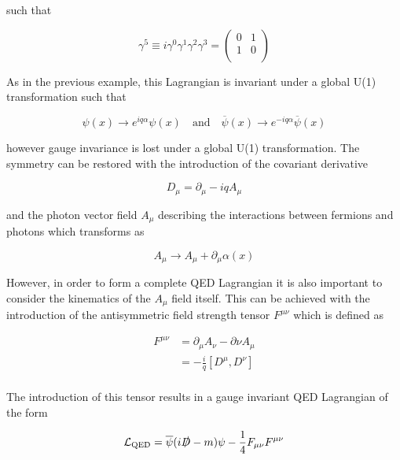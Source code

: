 \documentclass[12pt,a4paper,epsf,portrait,times,epsfig]{report}
\begin{document}
	such that

	\begin{equation}
		\gamma^{5} \equiv i\gamma^{0}\gamma^{1}\gamma^{2}\gamma^{3}=\begin{pmatrix}
			0 & 1 \\
			1 & 0 \\
		\end{pmatrix} 
	\end{equation}

	As in the previous example, this Lagrangian is invariant under a global U(1) transformation such that

	\begin{equation}
		\psi(x) \rightarrow e^{iq\alpha}\psi(x)  
		\quad\mathrm{and}\quad
		\overline{\psi}(x) \rightarrow e^{-iq\alpha}\overline{\psi}(x)
	\end{equation}

	however gauge invariance is lost under a global U(1) transformation. The symmetry can be restored with the introduction of the covariant derivative 
	
	\begin{equation}
		D_{\mu} = \partial_{\mu} - iqA_{\mu}
	\end{equation}

	and the photon vector field $A_{\mu}$ describing the interactions between fermions and photons which transforms as
	
	\begin{equation}
		A_{\mu} \rightarrow A_{\mu} + \partial_{\mu}\alpha(x)
	\end{equation}
	
	However, in order to form a complete QED Lagrangian it is also important to consider the kinematics of the $A_{\mu}$ field itself. This can be achieved with the introduction of the antisymmetric field strength tensor $F^{\mu\nu}$ which is defined as

	\begin{equation}
		\begin{split}
		F^{\mu\nu} &= \partial_{\mu}A_{\nu} - \partial{\nu}A_{\mu} \\
		&= -\frac{i}{q}[D^{\mu},D^{\nu}] \\
		\end{split}
	\end{equation}

	The introduction of this tensor results in a gauge invariant QED Lagrangian of the form

	\begin{equation}
		\mathcal{L}_{\mathrm{QED}}=\overline{\psi}(i\slashed{D}-m)\psi - \frac{1}{4}F_{\mu\nu}F^{\mu\nu}
	\end{equation}
\end{document}
